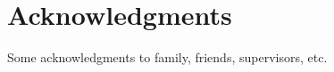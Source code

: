 \chapter*{Acknowledgments}

Some acknowledgments to family, friends, supervisors, etc.

\thispagestyle{empty}
\mbox{}
\newpage
